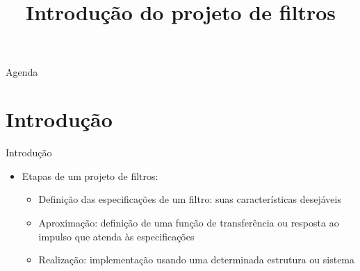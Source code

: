 

\title{\cursogrande\\ \vspace{1cm}Introdução do projeto de filtros}


\maketitle[randomdots={false}]
   \begin{slide}{Agenda}
      \tableofcontents[content=sections]
   \end{slide}

\section{Introdu\c c\~ao}

\begin{slide}{Introdu\c c\~ao}
\begin{itemize}
   \item Etapas de um projeto de filtros:
   \begin{itemize}
      \item Definição das especificações de um filtro: suas características desejáveis
      \item Aproximação: definição de uma função de transferência ou resposta ao impulso que atenda às especificações
      \item Realização: implementação usando uma determinada estrutura ou sistema
   \end{itemize}
\end{itemize}
\end{slide}

